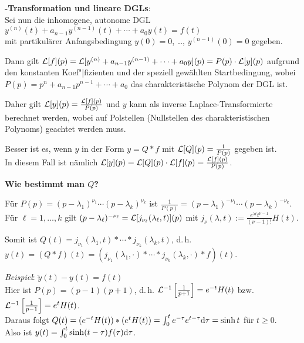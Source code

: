 \linie
\pagebreak

\textbf{-Transformation und lineare DGLs}: \\
Sei nun die inhomogene, autonome DGL
$y^{(n)}(t) + a_{n-1} y^{(n-1)}(t) + \dotsb + a_0 y(t) = f(t)$ \\
mit partikulärer Anfangsbedingung
$y(0) = 0$, \dots, $y^{(n-1)}(0) = 0$ gegeben.

Dann gilt
$\mathcal{L}[f](p) = \mathcal{L}[y^{(n)} + a_{n-1} y^{(n-1)} + \dotsb + a_0 y](p)
= P(p) \cdot \mathcal{L}[y](p)$ aufgrund den konstanten Koef"|fizienten und der speziell
gewählten Startbedingung, wobei
$P(p) = p^n + a_{n-1} p^{n-1} + \dotsb + a_0$ das charakteristische Polynom
der DGL ist.

Daher gilt $\mathcal{L}[y](p) = \frac{\mathcal{L}[f](p)}{P(p)}$ und $y$ kann als inverse
Laplace-Transformierte berechnet werden, wobei auf Polstellen (Nullstellen
des charakteristischen Polynoms) geachtet werden muss.

Besser ist es, wenn $y$ in der Form
$y = Q \ast f$ mit $\mathcal{L}[Q](p) = \frac{1}{P(p)}$ gegeben ist. \\
In diesem Fall ist nämlich
$\mathcal{L}[y](p) = \mathcal{L}[Q](p) \cdot \mathcal{L}[f](p) = \frac{\mathcal{L}[f](p)}{P(p)}$.

\linie

\textbf{Wie bestimmt man $Q$?}

Für $P(p) = (p - \lambda_1)^{\nu_1} \dotsm (p - \lambda_k)^{\nu_k}$
ist $\frac{1}{P(p)} = (p - \lambda_1)^{-\nu_1} \dotsm
(p - \lambda_k)^{-\nu_k}$. \\
Für $\ell = 1, \dotsc, k$ gilt
$(p - \lambda_\ell)^{-\nu_\ell} = \mathcal{L}[j_{\nu_\ell}(\lambda_\ell, t)](p)$ mit
$j_\nu(\lambda, t) := \frac{e^{\lambda t} t^{\nu-1}}{(\nu - 1)!} H(t)$.

Somit ist $Q(t) = j_{\nu_1}(\lambda_1, t) \ast \dotsm
\ast j_{\nu_k}(\lambda_k, t)$, d.\,h. \\
$y(t) = (Q \ast f)(t) =
(j_{\nu_1}(\lambda_1, \cdot) \ast \dotsb
\ast j_{\nu_k}(\lambda_k, \cdot) \ast f)(t)$.

\emph{Beispiel}:
$\ddot{y}(t) - y(t) = f(t)$ \\
Hier ist $P(p) = (p - 1)(p + 1)$,
d.\,h. $\mathcal{L}^{-1}\left[\frac{1}{p+1}\right] = e^{-t} H(t)$ bzw.
$\mathcal{L}^{-1}\left[\frac{1}{p-1}\right] = e^t H(t)$. \\
Daraus folgt $Q(t) = (e^{-t} H(t)) \ast (e^t H(t)) =
\int_0^t e^{-\tau} e^{t - \tau} \mathrm{d}\tau = \sinh t$ für $t \ge 0$. \\
Also ist $y(t) = \int_0^t \sinh(t - \tau) f(\tau) \mathrm{d}\tau$.

